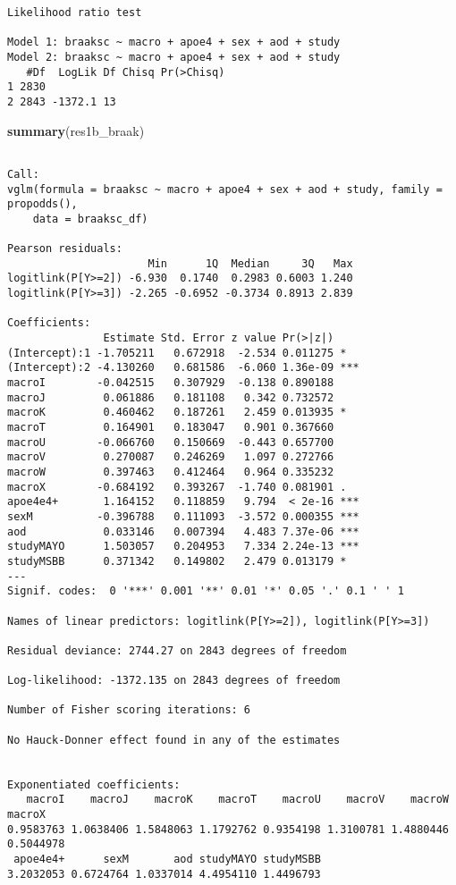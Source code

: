 \documentclass[]{book}
\newenvironment{Shaded}{\begin{snugshade}}{\end{snugshade}}
\newcommand{\KeywordTok}[1]{\textcolor[rgb]{0.13,0.29,0.53}{\textbf{#1}}}
\newcommand{\NormalTok}[1]{#1}
\begin{document}
\begin{verbatim}
Likelihood ratio test

Model 1: braaksc ~ macro + apoe4 + sex + aod + study
Model 2: braaksc ~ macro + apoe4 + sex + aod + study
   #Df  LogLik Df Chisq Pr(>Chisq)
1 2830                            
2 2843 -1372.1 13                 
\end{verbatim}

\begin{Shaded}
\begin{Highlighting}[]
\KeywordTok{summary}\NormalTok{(res1b_braak)}
\end{Highlighting}
\end{Shaded}

\begin{verbatim}

Call:
vglm(formula = braaksc ~ macro + apoe4 + sex + aod + study, family = propodds(), 
    data = braaksc_df)

Pearson residuals:
                      Min      1Q  Median     3Q   Max
logitlink(P[Y>=2]) -6.930  0.1740  0.2983 0.6003 1.240
logitlink(P[Y>=3]) -2.265 -0.6952 -0.3734 0.8913 2.839

Coefficients: 
               Estimate Std. Error z value Pr(>|z|)    
(Intercept):1 -1.705211   0.672918  -2.534 0.011275 *  
(Intercept):2 -4.130260   0.681586  -6.060 1.36e-09 ***
macroI        -0.042515   0.307929  -0.138 0.890188    
macroJ         0.061886   0.181108   0.342 0.732572    
macroK         0.460462   0.187261   2.459 0.013935 *  
macroT         0.164901   0.183047   0.901 0.367660    
macroU        -0.066760   0.150669  -0.443 0.657700    
macroV         0.270087   0.246269   1.097 0.272766    
macroW         0.397463   0.412464   0.964 0.335232    
macroX        -0.684192   0.393267  -1.740 0.081901 .  
apoe4e4+       1.164152   0.118859   9.794  < 2e-16 ***
sexM          -0.396788   0.111093  -3.572 0.000355 ***
aod            0.033146   0.007394   4.483 7.37e-06 ***
studyMAYO      1.503057   0.204953   7.334 2.24e-13 ***
studyMSBB      0.371342   0.149802   2.479 0.013179 *  
---
Signif. codes:  0 '***' 0.001 '**' 0.01 '*' 0.05 '.' 0.1 ' ' 1

Names of linear predictors: logitlink(P[Y>=2]), logitlink(P[Y>=3])

Residual deviance: 2744.27 on 2843 degrees of freedom

Log-likelihood: -1372.135 on 2843 degrees of freedom

Number of Fisher scoring iterations: 6 

No Hauck-Donner effect found in any of the estimates


Exponentiated coefficients:
   macroI    macroJ    macroK    macroT    macroU    macroV    macroW    macroX 
0.9583763 1.0638406 1.5848063 1.1792762 0.9354198 1.3100781 1.4880446 0.5044978 
 apoe4e4+      sexM       aod studyMAYO studyMSBB 
3.2032053 0.6724764 1.0337014 4.4954110 1.4496793 
\end{verbatim}
\end{document}
